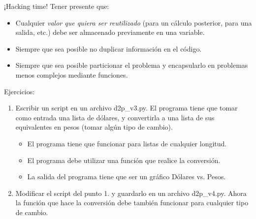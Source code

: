 \documentclass[9pt]{beamer}
\begin{document}
\begin{frame}{¡Hacking time!}
	Tener presente que:
	\begin{itemize}
		\item Cualquier \emph{valor que quiera ser reutilizado} (para un cálculo posterior, para una salida, etc.) \alert{debe ser almacenado previamente en una variable}.
		\item Siempre que sea posible \alert{no duplicar información} en el código.
		\item Siempre que sea posible \alert{particionar} el problema y \alert{encapsularlo} en problemas menos complejos mediante \alert{funciones}.
	\end{itemize}
\begin{block}{Ejercicios:}
	\begin{enumerate}
		\item Escribir un script en un archivo d2p\_v3.py. El programa tiene que tomar como entrada una lista de dólares, y convertirla a una lista de sus equivalentes en pesos (tomar algún tipo de cambio).
		\begin{itemize}
			\item El programa tiene que funcionar para listas de cualquier longitud.
			\item El programa debe utilizar una función que realice la conversión.
			\item La salida del programa tiene que ser un gráfico Dólares vs. Pesos.
		\end{itemize}
		\item Modificar el script del punto 1. y guardarlo en un archivo d2p\_v4.py. Ahora la función que hace la conversión debe también funcionar para cualquier tipo de cambio.
	\end{enumerate}
\end{block}

\end{frame}
\end{document}
